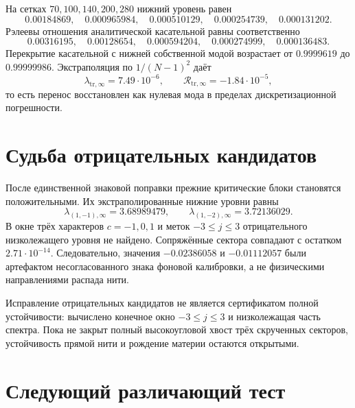 На сетках $70,100,140,200,280$ нижний уровень равен
\begin{equation}
 0.00184869,\quad 0.000965984,\quad 0.000510129,\quad
 0.000254739,\quad 0.000131202.
\end{equation}
Рэлеевы отношения аналитической касательной равны соответственно
\begin{equation}
 0.00316195,\quad 0.00128654,\quad 0.000594204,\quad
 0.000274999,\quad 0.000136483.
\end{equation}
Перекрытие касательной с нижней собственной модой возрастает от
$0.9999619$ до $0.99999986$. Экстраполяция по $1/(N-1)^2$ даёт
\begin{equation}
 \lambda_{\mathrm{tr},\infty}=7.49\cdot10^{-6},
 \qquad
 \mathcal R_{\mathrm{tr},\infty}=-1.84\cdot10^{-5},
\end{equation}
то есть перенос восстановлен как нулевая мода в пределах дискретизационной
погрешности.

\section{Судьба отрицательных кандидатов}

После единственной знаковой поправки прежние критические блоки становятся
положительными. Их экстраполированные нижние уровни равны
\begin{equation}
 \lambda_{(1,-1),\infty}=3.68989479,
 \qquad
 \lambda_{(1,-2),\infty}=3.72136029.
\end{equation}
В окне трёх характеров $c=-1,0,1$ и меток $-3\le j\le3$ отрицательного
низколежащего уровня не найдено. Сопряжённые сектора совпадают с остатком
$2.71\cdot10^{-14}$. Следовательно, значения $-0.02386058$ и
$-0.01112057$ были артефактом несогласованного знака фоновой калибровки, а
не физическими направлениями распада нити.

\begin{nogocriterion}
Исправление отрицательных кандидатов не является сертификатом полной
устойчивости: вычислено конечное окно $-3\le j\le3$ и низколежащая часть
спектра. Пока не закрыт полный высокоугловой хвост трёх скрученных секторов,
устойчивость прямой нити и рождение материи остаются открытыми.
\end{nogocriterion}

\section{Следующий различающий тест}

